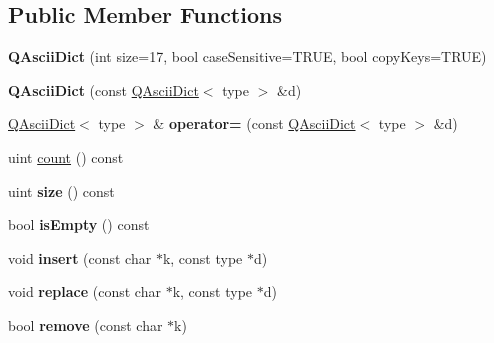 \subsection*{Public Member Functions}
\begin{DoxyCompactItemize}
\item 
\mbox{\label{class_q_ascii_dict_a45f3a7163f016feff94ec40fc2d16556}} 
{\bfseries Q\+Ascii\+Dict} (int size=17, bool case\+Sensitive=T\+R\+UE, bool copy\+Keys=T\+R\+UE)
\item 
\mbox{\label{class_q_ascii_dict_a78f2d7f76559477666281122c28cb3a3}} 
{\bfseries Q\+Ascii\+Dict} (const \mbox{\hyperlink{class_q_ascii_dict}{Q\+Ascii\+Dict}}$<$ type $>$ \&d)
\item 
\mbox{\label{class_q_ascii_dict_a70f70bfeacefca74f3e4c1f50eb48a16}} 
\mbox{\hyperlink{class_q_ascii_dict}{Q\+Ascii\+Dict}}$<$ type $>$ \& {\bfseries operator=} (const \mbox{\hyperlink{class_q_ascii_dict}{Q\+Ascii\+Dict}}$<$ type $>$ \&d)
\item 
uint \mbox{\hyperlink{class_q_ascii_dict_a2241b13419dc0fcb6da3bcd159219404}{count}} () const
\item 
\mbox{\label{class_q_ascii_dict_add47ad4cee8cf35e79864a06dede3ca4}} 
uint {\bfseries size} () const
\item 
\mbox{\label{class_q_ascii_dict_a3ece5970afa914f554824bef5e8e67c4}} 
bool {\bfseries is\+Empty} () const
\item 
\mbox{\label{class_q_ascii_dict_acc5f4b40410413caaa443c0fc3207642}} 
void {\bfseries insert} (const char $\ast$k, const type $\ast$d)
\item 
\mbox{\label{class_q_ascii_dict_a96d9b7c85141e7215bad0d371a347a40}} 
void {\bfseries replace} (const char $\ast$k, const type $\ast$d)
\item 
\mbox{\label{class_q_ascii_dict_aeb5f3b47e98054b30ccb2b29fac03b47}} 
bool {\bfseries remove} (const char $\ast$k)
\item 
\mbox{\label{class_q_ascii_dict_a7a8d7b8be1c0c1212f15c287ec927be9}} 

\end{DoxyCompactItemize}
